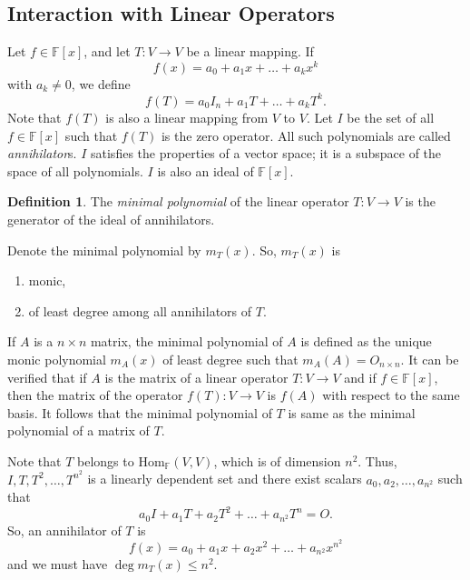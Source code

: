 \documentclass[15pt,a4paper]{book}
\theoremstyle{definition}
\newtheorem{definition}[theorem]{Definition}
\newcommand{\eax}[1]{\emph{#1}\index{#1}} %
\newcommand{\F}{\mathbb{F}}
\begin{document}
\subsection{Interaction with Linear Operators}
Let $f \in \F[x]$, and let $T:V \to V$ be a linear mapping. If
\begin{equation*}
    f(x) = a_{0} + a_{1}x + \ldots + a_{k}x^{k}
\end{equation*}
with $a_{k} \neq 0$, we define
\begin{equation*}
    f(T) = a_{0}I_{n} + a_{1}T + \ldots + a_{k}T^{k}.
\end{equation*}
Note that $f(T)$ is also a linear mapping from $V$ to $V$. Let $I$ be the set of all $f \in \F[x]$ such that $f(T)$ is the zero operator. All such polynomials are called \eax{annihilator}s. $I$ satisfies the properties of a vector space; it is a subspace of the space of all polynomials. $I$ is also an ideal of $\F[x]$.

\begin{definition}
    The \eax{minimal polynomial} of the linear operator $T:V \to V$ is the generator of the ideal of annihilators.
\end{definition}
Denote the minimal polynomial by $m_{T}(x)$. So, $m_{T}(x)$ is
\begin{enumerate}
    \item monic,
    \item of least degree among all annihilators of $T$.
\end{enumerate}
If $A$ is a $n \times n$ matrix, the minimal polynomial of $A$ is defined as the unique monic polynomial $m_{A}(x)$ of least degree such that $m_{A}(A) = O_{n \times n}$. It can be verified that if $A$ is the matrix of a linear operator $T:V \to V$ and if $f \in \F[x]$, then the matrix of the operator $f(T) : V \to V$ is $f(A)$ with respect to the same basis. It follows that the minimal polynomial of $T$ is same as the minimal polynomial of a matrix of $T$.

Note that $T$ belongs to $\text{Hom}_{\F}(V, V)$, which is of dimension $n^{2}$. Thus, $I, T, T^{2}, \ldots, T^{n^{2}}$ is a linearly dependent set and there exist scalars $a_{0},a_{2},\ldots,a_{n^{2}}$ such that
\begin{equation}
    a_{0}I + a_{1} T + a_{2}T^{2} + \ldots + a_{n^{2}} T^{n} = O.
\end{equation}
So, an annihilator of $T$ is
\begin{equation*}
    f(x) = a_{0} + a_{1}x + a_{2}x^{2} + \ldots + a_{n^{2}} x^{n^{2}}
\end{equation*}
and we must have $\deg m_{T}(x) \leq n^{2}$.
\end{document}
